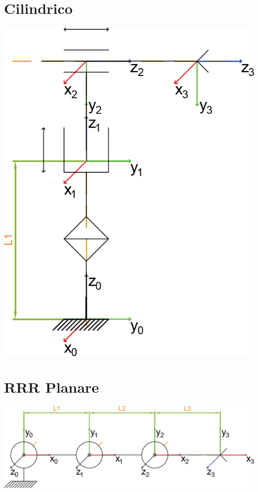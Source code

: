 \documentclass[a4paper,11pt]{article}
\begin{document}
\section*{Cilindrico}
\includegraphics{Sorgenti/Strutture/Cilindrico.png}


\section*{RRR Planare}
\includegraphics{Sorgenti/Strutture/RRRplanare.png}

\end{document}
